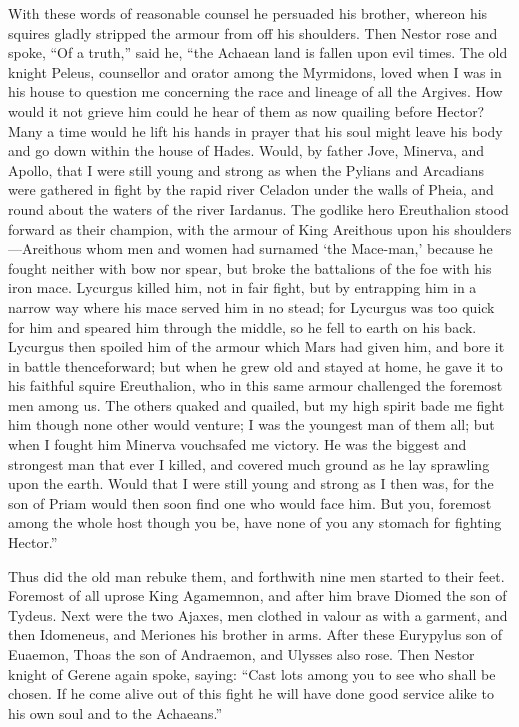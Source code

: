With these words of reasonable counsel he persuaded his brother, whereon
his squires gladly stripped the armour from off his shoulders. Then Nestor
rose and spoke, “Of a truth,” said he, “the Achaean land is fallen upon
evil times. The old knight Peleus, counsellor and orator among the
Myrmidons, loved when I was in his house to question me concerning the
race and lineage of all the Argives. How would it not grieve him could he
hear of them as now quailing before Hector? Many a time would he lift his
hands in prayer that his soul might leave his body and go down within the
house of Hades. Would, by father Jove, Minerva, and Apollo, that I were
still young and strong as when the Pylians and Arcadians were gathered in
fight by the rapid river Celadon under the walls of Pheia, and round about
the waters of the river Iardanus. The godlike hero Ereuthalion stood
forward as their champion, with the armour of King Areithous upon his
shoulders—Areithous whom men and women had surnamed ‘the Mace-man,’
because he fought neither with bow nor spear, but broke the battalions of
the foe with his iron mace. Lycurgus killed him, not in fair fight, but by
entrapping him in a narrow way where his mace served him in no stead; for
Lycurgus was too quick for him and speared him through the middle, so he
fell to earth on his back. Lycurgus then spoiled him of the armour which
Mars had given him, and bore it in battle thenceforward; but when he grew
old and stayed at home, he gave it to his faithful squire Ereuthalion, who
in this same armour challenged the foremost men among us. The others
quaked and quailed, but my high spirit bade me fight him though none other
would venture; I was the youngest man of them all; but when I fought him
Minerva vouchsafed me victory. He was the biggest and strongest man that
ever I killed, and covered much ground as he lay sprawling upon the earth.
Would that I were still young and strong as I then was, for the son of
Priam would then soon find one who would face him. But you, foremost among
the whole host though you be, have none of you any stomach for fighting
Hector.”

Thus did the old man rebuke them, and forthwith nine men started to their
feet. Foremost of all uprose King Agamemnon, and after him brave Diomed
the son of Tydeus. Next were the two Ajaxes, men clothed in valour as with
a garment, and then Idomeneus, and Meriones his brother in arms. After
these Eurypylus son of Euaemon, Thoas the son of Andraemon, and Ulysses
also rose. Then Nestor knight of Gerene again spoke, saying: “Cast lots
among you to see who shall be chosen. If he come alive out of this fight
he will have done good service alike to his own soul and to the Achaeans.”


